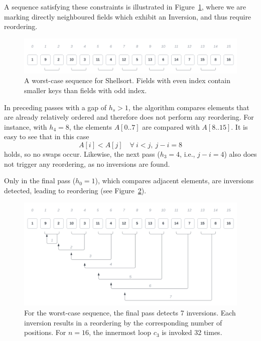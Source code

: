 \noindent
A sequence satisfying these constraints is illustrated in Figure~\ref{fig:worstcase_sequence}, where we are marking directly neighboured fields which exhibit an Inversion, and thus require reordering.

\begin{figure}[!h]
    \centering
    \includegraphics[width=1\columnwidth]{img/worstcase-sequence}
    \caption{A worst-case sequence for Shellsort. Fields with even index contain smaller keys than fields with odd index.}
    \label{fig:worstcase_sequence}
\end{figure}

In preceding passes with a gap of $h_s > 1$, the algorithm compares elements that are already relatively ordered and therefore does not perform any reordering.
For instance, with $h_4 = 8$, the elements $A[0..7]$ are compared with $A[8..15]$. It is easy to see that in this case
\[
    A[i] < A[j] \quad \forall\ i < j,\ j - i = 8
\]
holds, so no swaps occur.
Likewise, the next pass ($h_3 = 4$, i.e., $j - i = 4$) also does not trigger any reordering, as no inversions are found.

Only in the final pass ($h_0 = 1$), which compares adjacent elements, are inversions detected, leading to reordering (see Figure~\ref{fig:worstcase-sortsequence}).


\begin{figure}[!h]
    \centering
    \includegraphics[width=1\columnwidth]{img/worstcase-sortsequence}
    \caption{For the worst-case sequence, the final pass detects 7 inversions. Each inversion results in a reordering by the corresponding number of positions. For $n=16$, the innermost loop $c_3$ is invoked 32 times.
}
    \label{fig:worstcase-sortsequence}
\end{figure}

